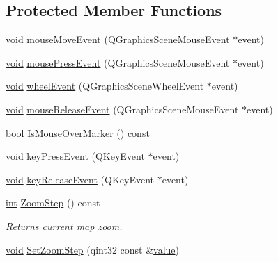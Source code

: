 \subsection*{Protected Member Functions}
\begin{DoxyCompactItemize}
\item 
\hyperlink{group___u_a_v_objects_plugin_ga444cf2ff3f0ecbe028adce838d373f5c}{void} \hyperlink{group___o_p_map_widget_ga60c7e55c1ee2c957be5233e999912521}{mouse\-Move\-Event} (Q\-Graphics\-Scene\-Mouse\-Event $\ast$event)
\item 
\hyperlink{group___u_a_v_objects_plugin_ga444cf2ff3f0ecbe028adce838d373f5c}{void} \hyperlink{group___o_p_map_widget_ga6f27143f563d9f5bb72d36e06078f488}{mouse\-Press\-Event} (Q\-Graphics\-Scene\-Mouse\-Event $\ast$event)
\item 
\hyperlink{group___u_a_v_objects_plugin_ga444cf2ff3f0ecbe028adce838d373f5c}{void} \hyperlink{group___o_p_map_widget_ga93a150c4f1ed84aa194b153b55bc9cd3}{wheel\-Event} (Q\-Graphics\-Scene\-Wheel\-Event $\ast$event)
\item 
\hyperlink{group___u_a_v_objects_plugin_ga444cf2ff3f0ecbe028adce838d373f5c}{void} \hyperlink{group___o_p_map_widget_gaba0f1f6f68f5a4765b966b704c7efddd}{mouse\-Release\-Event} (Q\-Graphics\-Scene\-Mouse\-Event $\ast$event)
\item 
bool \hyperlink{group___o_p_map_widget_ga974c2e697780b93234f9001d03d5e89f}{Is\-Mouse\-Over\-Marker} () const 
\item 
\hyperlink{group___u_a_v_objects_plugin_ga444cf2ff3f0ecbe028adce838d373f5c}{void} \hyperlink{group___o_p_map_widget_ga3c52576f9f0733ac4ea3882ce67a3ee0}{key\-Press\-Event} (Q\-Key\-Event $\ast$event)
\item 
\hyperlink{group___u_a_v_objects_plugin_ga444cf2ff3f0ecbe028adce838d373f5c}{void} \hyperlink{group___o_p_map_widget_ga2244e13f8bb36fe4230c1776f802e175}{key\-Release\-Event} (Q\-Key\-Event $\ast$event)
\item 
\hyperlink{ioapi_8h_a787fa3cf048117ba7123753c1e74fcd6}{int} \hyperlink{group___o_p_map_widget_gac33e6f99e690bfc9725bbb33b9078d91}{Zoom\-Step} () const 
\begin{DoxyCompactList}\small\item\em Returns current map zoom. \end{DoxyCompactList}\item 
\hyperlink{group___u_a_v_objects_plugin_ga444cf2ff3f0ecbe028adce838d373f5c}{void} \hyperlink{group___o_p_map_widget_ga45d9811a4fc7a2a8c6a677b4501a031d}{Set\-Zoom\-Step} (qint32 const \&\hyperlink{glext_8h_aa0e2e9cea7f208d28acda0480144beb0}{value})

\end{DoxyCompactItemize}
